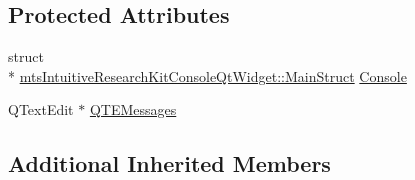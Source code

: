 \subsection*{Protected Attributes}
\begin{DoxyCompactItemize}
\item 
struct \\*
\hyperlink{structmts_intuitive_research_kit_console_qt_widget_1_1_main_struct}{mts\-Intuitive\-Research\-Kit\-Console\-Qt\-Widget\-::\-Main\-Struct} \hyperlink{classmts_intuitive_research_kit_console_qt_widget_ae208e1eebd3fd748c44c27b8d5b447b1}{Console}
\item 
Q\-Text\-Edit $\ast$ \hyperlink{classmts_intuitive_research_kit_console_qt_widget_a093140f95bcc868675cf280ac128f697}{Q\-T\-E\-Messages}
\end{DoxyCompactItemize}
\subsection*{Additional Inherited Members}


